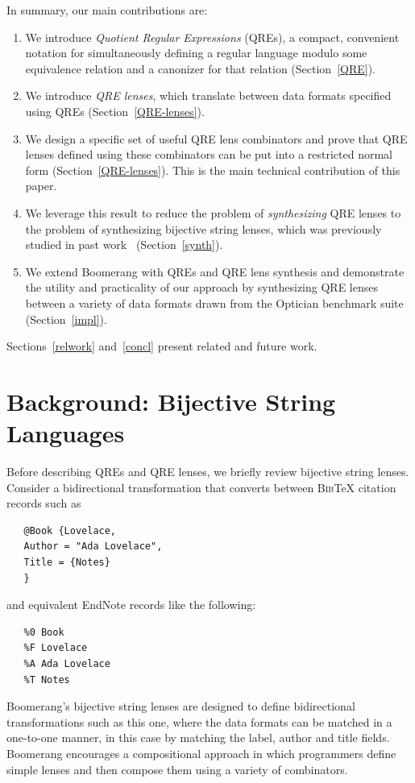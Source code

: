 \documentclass[acmsmall,review,anonymous]{acmart}
\newcommand{\bibtex}{\textsc{Bib}\TeX{}}
\begin{document}
In summary, our main contributions are:
\begin{enumerate}
  \item We introduce {\em Quotient Regular Expressions} (QREs), 
  a compact, convenient notation for simultaneously defining a
  regular language modulo some equivalence relation and a canonizer
  for that relation (Section~\ref{QRE}).
  \item We introduce {\em QRE lenses}, which translate between data formats
  specified using QREs (Section~\ref{QRE-lenses}).
  \item We design a specific set of useful QRE lens combinators and prove
  that QRE lenses defined using these combinators can be put into a
  restricted normal form (Section~\ref{QRE-lenses}).  This is
  the main technical contribution of this paper.
  \item We leverage this result to reduce the problem of {\em synthesizing} QRE
  lenses to the problem of synthesizing bijective string lenses, which was
  previously studied in past work~\cite{optician} (Section~\ref{synth}).
  \item We extend Boomerang with QREs and QRE lens synthesis and demonstrate
  the utility and practicality of our approach by synthesizing QRE lenses
  between a variety of data formats drawn from the Optician benchmark suite
  (Section~\ref{impl}).
\end{enumerate}
Sections~\ref{relwork} and~\ref{concl} present related and future work.

\section{Background: Bijective String Languages}
\label{sec:background}
Before describing QREs and QRE lenses, we briefly review bijective
string lenses. Consider a bidirectional transformation that converts
between \bibtex{} citation records such as
\begin{verbatim}
   @Book {Lovelace,
   Author = "Ada Lovelace",
   Title = {Notes}
   }
\end{verbatim}
\noindent
and equivalent EndNote records like the following:
\begin{verbatim}
   %0 Book
   %F Lovelace
   %A Ada Lovelace
   %T Notes
\end{verbatim}
\noindent
Boomerang's bijective string lenses are designed to define bidirectional
transformations such as this one, where the data formats can be matched in a
one-to-one manner, in this case by matching the label, author and title fields.
Boomerang encourages a compositional approach in which programmers
define simple lenses and then compose them using a variety of
combinators. 
\end{document}
